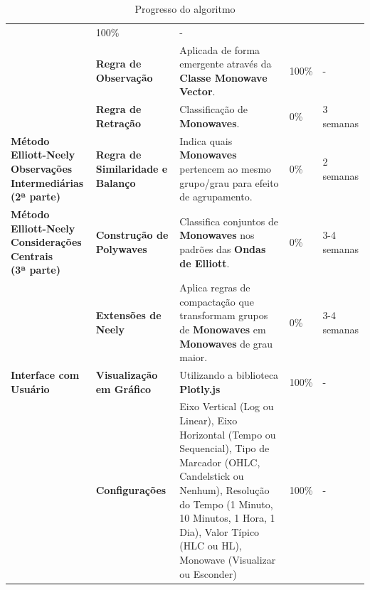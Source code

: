 \documentclass[12pt]{article}
\begin{document}
\begin{table}[H]
\begin{tabular}{|L{3cm}|L{2cm}|L{5cm}|R{1.4cm}|R{1.4cm}|}
		& 100\%
		& - \\
		& \textbf{Regra de Observação}
		& Aplicada de forma emergente através da \textbf{Classe Monowave Vector}.
		& 100\%
		& - \\
		& \textbf{Regra de Retração}
		& Classificação de \textbf{Monowaves}.
		& 0\%
		& 3 semanas \\
	\hline
	\textbf{Método Elliott-Neely \newline Observações Intermediárias \newline (2ª parte)}
		& \textbf{Regra de Similaridade e Balanço}
		& Indica quais \textbf{Monowaves} pertencem ao mesmo grupo/grau para efeito de agrupamento.
		& 0\%
		& 2 semanas \\
	\hline
	\textbf{Método Elliott-Neely \newline Considerações Centrais \newline (3ª parte)}
		& \textbf{Construção de Polywaves}
		& Classifica conjuntos de \textbf{Monowaves} nos padrões das \textbf{Ondas de Elliott}.
		& 0\%
		& 3-4 semanas \\
		& \textbf{Extensões de Neely}
		& Aplica regras de compactação que transformam grupos de \textbf{Monowaves} em \textbf{Monowaves} de grau maior.
		& 0\%
		& 3-4 semanas \\
	\hline
	\textbf{Interface com Usuário}
		& \textbf{Visualização em Gráfico}
		& Utilizando a biblioteca \textbf{Plotly.js}
		& 100\%
		& - \\
		& \textbf{Configurações}
		& Eixo Vertical (Log ou Linear), Eixo Horizontal (Tempo ou Sequencial), Tipo de Marcador (OHLC, Candelstick ou Nenhum), Resolução do Tempo (1 Minuto, 10 Minutos, 1 Hora, 1 Dia), Valor Típico (HLC ou HL), Monowave (Visualizar ou Esconder)
		& 100\%
		& - \\
	\hline
\end{tabular} 
\caption{Progresso do algoritmo}
\label{tab:progresso}
\end{table}
\endgroup

\newpage

\raggedright

{}


\newpage

{}
\end{document}
